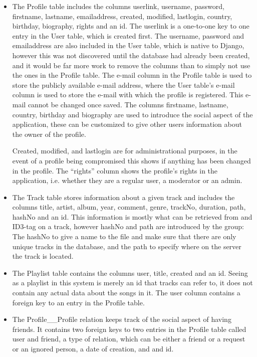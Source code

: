 \begin{itemize}
\item The Profile table includes the columns userlink, username, password, firstname, lastname, emailaddress, created, modified, lastlogin, country, birthday, biography, rights and an id.  The userlink is a one-to-one key to one entry in the User table, which is created first. The username, password and emailaddress are also included in the User table, which is native to Django, however this was not discovered until the database had already been created, and it would be far more work to remove the columns than to simply not use the ones in the Profile table. The e-mail column in the Profile table is used to store the publicly available e-mail address, where the User table's e-mail column is used to store the e-mail with which the profile is registered. This e-mail cannot be changed once saved. The columns firstname, lastname, country, birthday and biography are used to introduce the social aspect of the application, these can be customized to give other users information about the owner of the profile. 

Created, modified, and lastlogin are for administrational purposes, in the event of a profile being compromised this shows if anything has been changed in the profile. The ``rights'' column shows the profile's rights in the application, i.e. whether they are a regular user, a moderator or an admin. 

\item The Track table stores information about a given track and includes the columns title, artist, album, year, comment, genre, trackNo, duration, path, hashNo and an id. This information is mostly what can be retrieved from and ID3-tag on a track, however hashNo and path are introduced by the group: The hashNo to give a name to the file and make sure that there are only unique tracks in the database, and the path to specify where on the server the track is located. 

\item The Playlist table contains the columns user, title, created and an id. Seeing as a playlist in this system is merely an id that tracks can refer to, it does not contain any actual data about the songs in it. The user column contains a foreign key to an entry in the Profile table.

\item The Profile\_\_Profile relation keeps track of the social aspect of having friends. It contains two foreign keys to two entries in the Profile table called user and friend, a type of relation, which can be either a friend or a request or an ignored person, a date of creation, and and id.


\end{itemize}
